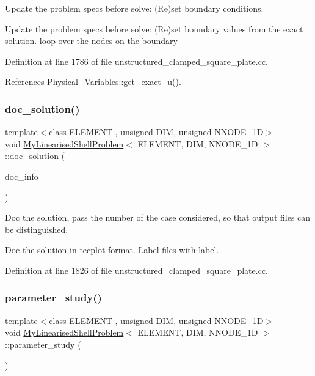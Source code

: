 Update the problem specs before solve\+: (Re)set boundary conditions. 

Update the problem specs before solve\+: (Re)set boundary values from the exact solution. loop over the nodes on the boundary 

Definition at line 1786 of file unstructured\+\_\+clamped\+\_\+square\+\_\+plate.\+cc.



References Physical\+\_\+\+Variables\+::get\+\_\+exact\+\_\+u().

\mbox{\label{classMyLinearisedShellProblem_a5894d8fae239fd5255b6a661cbc23fa5}} 
\subsubsection{\texorpdfstring{doc\+\_\+solution()}{doc\_solution()}}
{\footnotesize\ttfamily template$<$class E\+L\+E\+M\+E\+NT , unsigned D\+IM, unsigned N\+N\+O\+D\+E\+\_\+1D$>$ \\
void \hyperlink{classMyLinearisedShellProblem}{My\+Linearised\+Shell\+Problem}$<$ E\+L\+E\+M\+E\+NT, D\+IM, N\+N\+O\+D\+E\+\_\+1D $>$\+::doc\+\_\+solution (\begin{DoxyParamCaption}\item[{Doc\+Info \&}]{doc\+\_\+info }\end{DoxyParamCaption})}



Doc the solution, pass the number of the case considered, so that output files can be distinguished. 

Doc the solution in tecplot format. Label files with label. 

Definition at line 1826 of file unstructured\+\_\+clamped\+\_\+square\+\_\+plate.\+cc.

\mbox{\label{classMyLinearisedShellProblem_ab9255e3cbaae69ad5d61757d891b633e}} 
\subsubsection{\texorpdfstring{parameter\+\_\+study()}{parameter\_study()}}
{\footnotesize\ttfamily template$<$class E\+L\+E\+M\+E\+NT , unsigned D\+IM, unsigned N\+N\+O\+D\+E\+\_\+1D$>$ \\
void \hyperlink{classMyLinearisedShellProblem}{My\+Linearised\+Shell\+Problem}$<$ E\+L\+E\+M\+E\+NT, D\+IM, N\+N\+O\+D\+E\+\_\+1D $>$\+::parameter\+\_\+study (\begin{DoxyParamCaption}{ }\end{DoxyParamCaption})}



